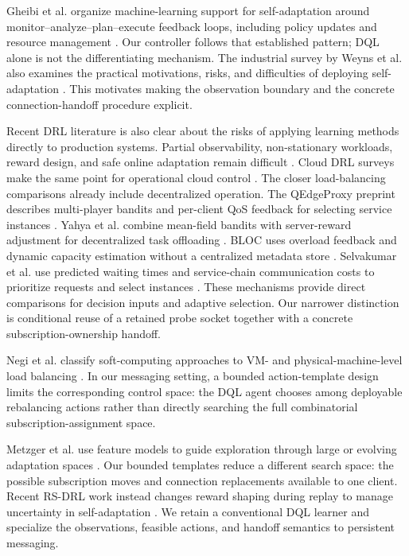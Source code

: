 \documentclass[manuscript,nonacm]{acmart}
\begin{document}
Gheibi et al. organize machine-learning support for self-adaptation around
monitor--analyze--plan--execute feedback loops, including policy updates and
resource management \cite{Gheibi2021MLSelfAdaptation}. Our controller follows
that established pattern; DQL alone is not the differentiating mechanism.
The industrial survey by Weyns et al. also examines the practical motivations,
risks, and difficulties of deploying self-adaptation
\cite{Weyns2023Industry}. This motivates making the observation boundary and
the concrete connection-handoff procedure explicit.

Recent DRL literature is also clear about the risks of applying learning
methods directly to production systems. Partial observability, non-stationary
workloads, reward design, and safe online adaptation remain difficult
\cite{DulacArnold2021}. Cloud DRL surveys make the same point for operational
cloud control \cite{Zhou2024DRLCloudReview}. The closer load-balancing
comparisons already include decentralized operation. The QEdgeProxy preprint
describes multi-player bandits and per-client QoS feedback for selecting
service instances \cite{Cilic2025}. Yahya et al. combine mean-field bandits
with server-reward adjustment for decentralized task offloading
\cite{Yahya2024}. BLOC uses overload feedback and dynamic capacity estimation
without a centralized metadata store \cite{Bhattacharya2024}. Selvakumar
et al. use predicted waiting times and service-chain communication costs to
prioritize requests and select instances \cite{Selvakumar2023}. These
mechanisms provide direct comparisons for decision inputs and adaptive
selection. Our narrower distinction is conditional reuse of a retained probe
socket together with a concrete subscription-ownership handoff.

Negi et al. classify soft-computing approaches to VM- and physical-machine-level
load balancing \cite{Singh2023SoftCloudLB}. In our messaging setting, a bounded
action-template design limits the corresponding control space: the DQL agent
chooses among deployable rebalancing actions rather than directly searching
the full combinatorial subscription-assignment space.

Metzger et al. use feature models to guide exploration through large or
evolving adaptation spaces \cite{Metzger2024GuidedExploration}. Our bounded
templates reduce a different search space: the possible subscription moves
and connection replacements available to one client. Recent RS-DRL work
instead changes reward shaping during replay to manage uncertainty in
self-adaptation \cite{Kavianifar2026RSDRL}. We retain a conventional DQL
learner and specialize the observations, feasible actions, and handoff
semantics to persistent messaging.
\end{document}
